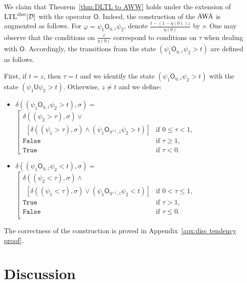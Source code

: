 \documentclass{llncs}
\newcommand{\True}{\mathtt{True}}
\newcommand{\False}{\mathtt{False}}
\newcommand{\LTL}{{\ensuremath{\rm LTL}}\xspace}
\newcommand{\Until}{\mathsf{U}}
\newcommand{\parUntil}{\mathsf{O}}
\newcommand{\AWW}{\mbox{\rm AWA}\xspace}
\newcommand{\D}{{\cal D}}
\renewcommand{\phi}{\varphi}
\newcommand{\DLTL}{\ensuremath{\LTL^{\text{disc}}[\D]}}
\newcommand{\df}{\eta}
\begin{document}
We claim that Theorem~\ref{thm:DLTL to AWW} holds under the extension of $\DLTL$ with the operator $\parUntil$.
Indeed, the construction of the $\AWW$ is augmented as follows. For $\phi=\psi_1\parUntil_{\df,z}\psi_2$, denote $\frac{t-(1-\df(0))z}{\df(0)}$ by $\tau$. One may observe that the conditions on $\frac{t}{\df(0)}$ correspond to conditions on $\tau$ when dealing with $\parUntil$. Accordingly, the transitions from the state $(\psi_1\parUntil_{\df,z} \psi_2>t)$ are defined as follows.

First, if $t=z$, then $\tau=t$ and we identify the state $(\psi_1\parUntil_{\df,z} \psi_2>t)$ with the state
$(\psi_1\Until \psi_2>t)$. Otherwise, $z\neq t$ and we define:
\begin{itemize}
\item
$\delta((\psi_1\parUntil_{\df,z} \psi_2>t),\sigma)=$
 $\left[\begin{array}{ll}
\delta((\psi_2> \tau),\sigma)\vee & \\

\ \ [\delta((\psi_1>\tau),\sigma)\wedge (\psi_1\parUntil_{\df^{+1},z}\psi_2> t)] & \mbox{if $0\le \tau< 1$},\\
\False &  \mbox{if $\tau \geq 1$},\\
\True &  \mbox{if $\tau < 0$}.
\end{array}
\right.$

\item
$\delta((\psi_1\parUntil_{\df,z} \psi_2<t),\sigma)=
$
$
\left[\begin{array}{ll}
\delta((\psi_2< \tau),\sigma)\wedge & \\

\ \ [\delta((\psi_1<\tau),\sigma)\vee (\psi_1\parUntil_{\df^{+1},z}\psi_2< t)] & \mbox{if $0< \tau\le 1$},\\
\True &  \mbox{if $\tau > 1$},\\
\False &  \mbox{if $\tau \le 0$}.\\
\end{array}
\right.$
\end{itemize}
The correctness of the construction is proved in Appendix~\ref{apx:disc tendency proof}.




\section{Discussion}
\end{document}
